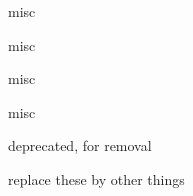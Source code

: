 \begin{frame}{misc}
\begin{Demo}{misc}
\end{Demo}
\end{frame}

\begin{frame}{misc}
\begin{Demo}{misc}

\end{Demo}
\end{frame}
\begin{frame}{deprecated, for removal}
\begin{Demo}{replace these by other things}
\end{Demo}
\end{frame}

